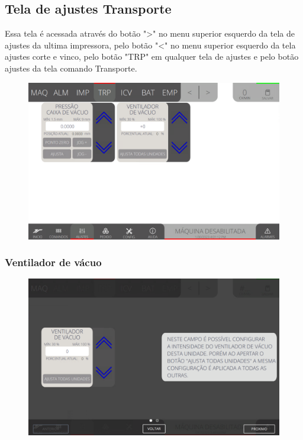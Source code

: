 \newpage
\thispagestyle{fancy}
\vspace*{40 pt}
\subsection{Tela de ajustes Transporte} \label{sec:telaConfiguracoesTransporte}
Essa tela é acessada através do botão "\textgreater" no menu superior esquerdo da tela de ajustes da ultima impressora, pelo botão "\textless{}" no menu superior esquerdo 
 da tela ajustes corte e vinco, pelo botão "TRP" em qualquer tela de ajustes e pelo botão ajustes da tela comando Transporte.
\vspace*{\fill}
\begin{figure}[h]
    \centering
    \includegraphics[width=480 px,height=300 px]{src/imagesICV/05-transport/settings/e-Tela-Principal.png}
\end{figure}
\vspace*{\fill}

\newpage
\thispagestyle{fancy}
\vspace*{40 pt}
\subsubsection{\small{Ventilador de vácuo}} \label{sec:telaConfiguracoesTransporteVentiladorVaco}
\vspace*{\fill}
\begin{figure}[h]
    \centering
    \includegraphics[width=576 px,height=360 px]{src/imagesICV/05-transport/settings/1.png}
\end{figure}
\vspace*{\fill}

